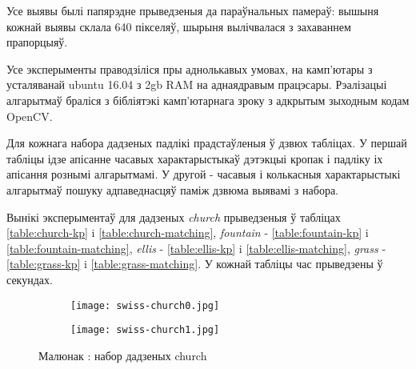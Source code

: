 Усе выявы былі папярэдне прыведзеныя да параўнальных памераў: вышыня кожнай выявы склала 640 пікселяў,
шырыня вылічвалася з захаваннем прапорцыяў.

Усе эксперыменты праводзіліся пры аднолькавых умовах, на камп'ютары з усталяванай ubuntu 16.04 з 2gb RAM на аднаядравым працэсары.
Рэалізацыі алгарытмаў браліся з бібліятэкі камп'ютарнага зроку з адкрытым зыходным кодам OpenCV.

Для кожнага набора дадзеных падлікі прадстаўленыя ў дзвюх табліцах.
У першай табліцы ідзе апісанне часавых характарыстыкаў дэтэкцыі кропак і падліку іх апісання рознымі алгарытмамі.
У другой - часавыя і колькасныя характарыстыкі алгарытмаў пошуку адпаведнасцяў паміж дзвюма выявамі з набора.

Вынікі эксперыментаў для дадзеных \textit{church} прыведзеныя ў табліцах \ref{table:church-kp} i \ref{table:church-matching},
\textit{fountain} - \ref{table:fountain-kp} i \ref{table:fountain-matching},
\textit{ellis} - \ref{table:ellis-kp} i \ref{table:ellis-matching},
\textit{grass} - \ref{table:grass-kp} i \ref{table:grass-matching}. У кожнай табліцы час прыведзены ў секундах.

\begin{figure}[H]
\centering
\begin{subfigure}{.5\textwidth}
  \centering
  \texttt{[image: swiss-church0.jpg]}
\end{subfigure}%
\begin{subfigure}{.5\textwidth}
  \centering
  \texttt{[image: swiss-church1.jpg]}
\end{subfigure}
\captionsetup{labelformat=empty}
\caption{Малюнак : набор дадзеных church}
\label{fig:church}
\end{figure}

